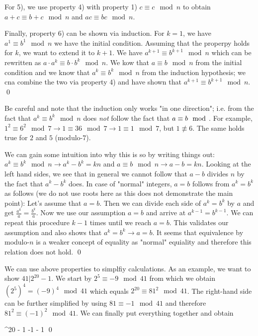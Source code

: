 For 5), we use property 4) with property 1) $c \equiv c \mod n$ to obtain $a + c \equiv b + c \mod n$ and $ac \equiv bc \mod n$.

Finally, property 6) can be shown via induction. For $k = 1$, we have $a^1 \equiv b^1 \mod n$ we have the initial condition. Assuming that the properpy holds for $k$, we want to extend it to $k+1$. We have $a^{k+1} \equiv b^{k+1} \mod n$ which can be rewritten as $a \cdot a^k \equiv b \cdot b^k \mod n$. We kow that $a \equiv b \mod n$ from the initial condition and we know that $a^k \equiv b^k \mod n$ from the induction hypothesis; we cna combine the two via property 4) and have shown that $a^{k+1} \equiv b^{k+1} \mod n$. \qed

Be careful and note that the induction only works "in one direction"; i.e. from the fact that $a^k \equiv b^k \mod n$ does \emph{not} follow the fact that $a \equiv b \mod$. For example, $1^2 \equiv 6^2 \mod 7 \rightarrow 1 \equiv 36 \mod 7 \rightarrow 1 \equiv 1 \mod 7$, but $1 \not\equiv 6$. The same holds true for $2$ and $5$ (modulo-$7$).

We can gain some intuition into why this is so by writing things out: $a^k \equiv b^k \mod n \rightarrow a^k - b^k = kn$ and $a \equiv b  \mod n \rightarrow a - b = kn$. Looking at the left hand sides, we see that in general we cannot follow that $a -b $ divides $n$ by the fact that $a^k - b^k$ does. In case of "normal" integers, $a = b$ follows from $a^k = b^k$ as follows (we do not use roots here as this does not demonstrate the main point): Let's assume that $a = b$. Then we can divide each side of $a^k = b^k$ by $a$ and get $\frac{a^k}{a} = \frac{b^k}{a}$. Now we use our assumption $a = b$ and arrive at $a^{k-1} = b^{k-1}$. We can repeat this procedure $k-1$ times until we reach $a = b$. This validates our assumption and also shows that $a^k = b^k \rightarrow a= b$. It seems that equivalence by modulo-$n$ is a weaker concept of equality as "normal" equiality and therefore this relation does not hold. \qed


We can use above properties to simplfiy calculations. As an example, we want to show $41 | 2^{20} - 1$. We start by $2^5 \equiv -9 \mod 41$ from which we obtain $(2^5)^4 = (-9)^4 \mod 41$ which equals $2^{20} \equiv 81^2 \mod 41$. The right-hand side can be further simplified by using $81 \equiv -1 \mod 41$ and therefore $81^2 \equiv (-1)^2 \mod 41$. We can finally put everything together and obtain

^{20} - 1   -1  - 1   \qed
\eee

